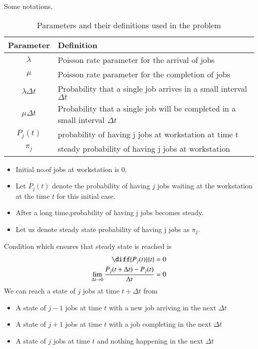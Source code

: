 \documentclass[journal,12pt,twocolumn]{IEEEtran}
\begin{document}
 Some notations,
 \begin{table}[h]
\begin{tabular}{|c|p{6cm}|}
\hline
\textbf{Parameter} & \textbf{Definition}                               \\ \hline
$\lambda$          & Poisson rate parameter for the arrival of jobs    \\ \hline
$\mu$              & Poisson rate parameter for the completion of jobs \\ \hline
$\lambda \Delta t$ & Probability that a single job arrives in a small interval $\Delta t$\\\hline 
$\mu \Delta t$ & Probability that a single job will be completed in a small interval $\Delta t$\\\hline 
$P_j(t)$             & probability of having j jobs at workstation at time t \\\hline
$\pi_j$            & steady probability of having j jobs at workstation\\\hline
\end{tabular}
\caption{Parameters and their definitions used in the problem}
\label{tab:parameters}
\end{table}
 \begin{itemize}
     \item  Initial no.of jobs at workstation is 0.
     \item Let $P_{j}(t)$ denote the probability of having $j$ jobs waiting at the workstation at the time $t$ for this initial case.
     \item After a long time,probability of having  j jobs becomes steady.
     \item Let us denote steady state probability of having j jobs as $\pi_j$.
 \end{itemize}
 Condition which ensures that steady state is reached is
 \begin{align}
     \diff{P_j(t)}{t}&=0\\
     \lim_{\Delta t\rightarrow 0}\dfrac{P_j(t+\Delta t)-P_j (t)}{\Delta t}&=0\label{steady-condition}
 \end{align}
  We can reach a state of $j$ jobs at time $t+\Delta t$ from
  \begin{itemize}
      \item A state of $j-1$ jobs at time $t$ with a new job arriving in the next $\Delta t$
      \item A state of $j+1$ jobs at time $t$ with a job completing in the next $\Delta t$
      \item A state of $j$ jobs at time $t$ and nothing happening in the next $\Delta t$
  \end{itemize}
\end{document}
